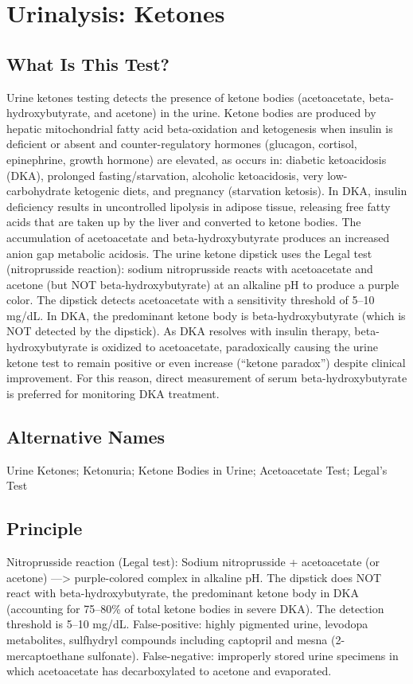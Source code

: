 \chapter{Urinalysis: Ketones}
\section*{What Is This Test?}
Urine ketones testing detects the presence of ketone bodies (acetoacetate, beta-hydroxybutyrate, and acetone) in the urine. Ketone bodies are produced by hepatic mitochondrial fatty acid beta-oxidation and ketogenesis when insulin is deficient or absent and counter-regulatory hormones (glucagon, cortisol, epinephrine, growth hormone) are elevated, as occurs in: diabetic ketoacidosis (DKA), prolonged fasting/starvation, alcoholic ketoacidosis, very low-carbohydrate ketogenic diets, and pregnancy (starvation ketosis). In DKA, insulin deficiency results in uncontrolled lipolysis in adipose tissue, releasing free fatty acids that are taken up by the liver and converted to ketone bodies. The accumulation of acetoacetate and beta-hydroxybutyrate produces an increased anion gap metabolic acidosis. The urine ketone dipstick uses the Legal test (nitroprusside reaction): sodium nitroprusside reacts with acetoacetate and acetone (but NOT beta-hydroxybutyrate) at an alkaline pH to produce a purple color. The dipstick detects acetoacetate with a sensitivity threshold of 5--10 mg/dL. In DKA, the predominant ketone body is beta-hydroxybutyrate (which is NOT detected by the dipstick). As DKA resolves with insulin therapy, beta-hydroxybutyrate is oxidized to acetoacetate, paradoxically causing the urine ketone test to remain positive or even increase (``ketone paradox'') despite clinical improvement. For this reason, direct measurement of serum beta-hydroxybutyrate is preferred for monitoring DKA treatment.
\section*{Alternative Names}
Urine Ketones; Ketonuria; Ketone Bodies in Urine; Acetoacetate Test; Legal's Test
\section*{Principle}
Nitroprusside reaction (Legal test): Sodium nitroprusside + acetoacetate (or acetone) ---> purple-colored complex in alkaline pH. The dipstick does NOT react with beta-hydroxybutyrate, the predominant ketone body in DKA (accounting for 75--80\% of total ketone bodies in severe DKA). The detection threshold is 5--10 mg/dL. False-positive: highly pigmented urine, levodopa metabolites, sulfhydryl compounds including captopril and mesna (2-mercaptoethane sulfonate). False-negative: improperly stored urine specimens in which acetoacetate has decarboxylated to acetone and evaporated.
